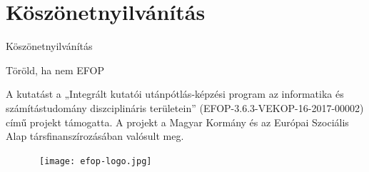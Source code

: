 \chapter*{Köszönetnyilvánítás}

\ifdefined\printName

{Köszönetnyilvánítás}

\hfill\break
\hfill\break

\fi

{Töröld, ha nem EFOP}

A kutatást a „Integrált kutatói utánpótlás-képzési program az informatika és számítástudomány diszciplináris területein” (EFOP-3.6.3-VEKOP-16-2017-00002) című projekt támogatta. 
A projekt a Magyar Kormány és az Európai Szociális Alap társfinanszírozásában valósult meg.

\begin{figure}[b]
    \hbox{\hspace{26em} \texttt{[image: efop-logo.jpg]}}
\end{figure}
